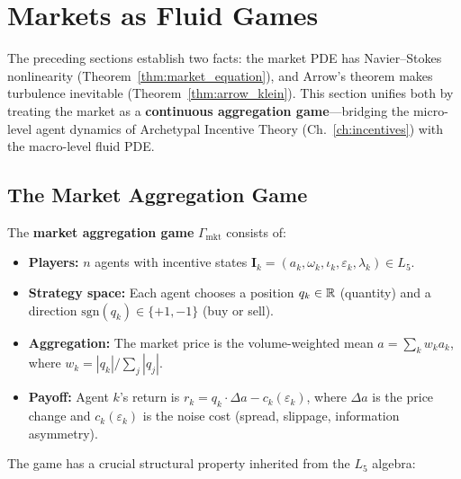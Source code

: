 \section{Markets as Fluid Games}\label{sec:fluid_games}

The preceding sections establish two facts: the market PDE has Navier--Stokes nonlinearity (Theorem~\ref{thm:market_equation}), and Arrow's theorem makes turbulence inevitable (Theorem~\ref{thm:arrow_klein}). This section unifies both by treating the market as a \textbf{continuous aggregation game}---bridging the micro-level agent dynamics of Archetypal Incentive Theory (Ch.~\ref{ch:incentives}) with the macro-level fluid PDE.

\subsection{The Market Aggregation Game}

\begin{definition}\label{def:market_game}
The \textbf{market aggregation game} $\Gamma_{\mathrm{mkt}}$ consists of:
\begin{itemize}[noitemsep]
  \item \textbf{Players:} $n$ agents with incentive states $\mathbf{I}_k = (a_k, \omega_k, \iota_k, \varepsilon_k, \lambda_k) \in L_5$.
  \item \textbf{Strategy space:} Each agent chooses a position $q_k \in \mathbb{R}$ (quantity) and a direction $\mathrm{sgn}(q_k) \in \{+1, -1\}$ (buy or sell).
  \item \textbf{Aggregation:} The market price is the volume-weighted mean $a = \sum_k w_k a_k$, where $w_k = |q_k| / \sum_j |q_j|$.
  \item \textbf{Payoff:} Agent $k$'s return is $r_k = q_k \cdot \Delta a - c_k(\varepsilon_k)$, where $\Delta a$ is the price change and $c_k(\varepsilon_k)$ is the noise cost (spread, slippage, information asymmetry).
\end{itemize}
\end{definition}

The game has a crucial structural property inherited from the $L_5$ algebra:

